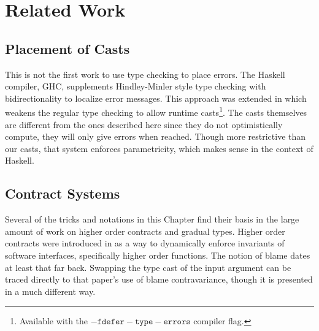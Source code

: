 \section{Related Work}
 
 
 
 
\subsection{\Bidir Placement of Casts}
 
This is not the first work to use \bidir{} type checking to place errors.
The Haskell compiler, GHC, supplements Hindley-Minler style type checking with bidirectionality to localize error messages.
This approach was extended in \cite{10.1145/2364527.2364554} which weakens the regular type checking to allow runtime casts\footnote{
 Available with the $\mathtt{-fdefer-type-errors}$ compiler flag.}.
The casts themselves are different from the ones described here since they do not optimistically compute, they will only give errors when reached.
Though more restrictive than our casts, that system enforces parametricity, which makes sense in the context of Haskell.
 
 

\subsection{Contract Systems}
 
Several of the tricks and notations in this Chapter find their basis in the large amount of work on higher order contracts and gradual types.
Higher order contracts were introduced in \cite{10.1145/581478.581484} as a way to dynamically enforce invariants of software interfaces, specifically higher order functions.
The notion of blame dates at least that far back.
Swapping the type cast of the input argument can be traced directly to that paper's use of blame contravariance, though it is presented in a much different way.
 

